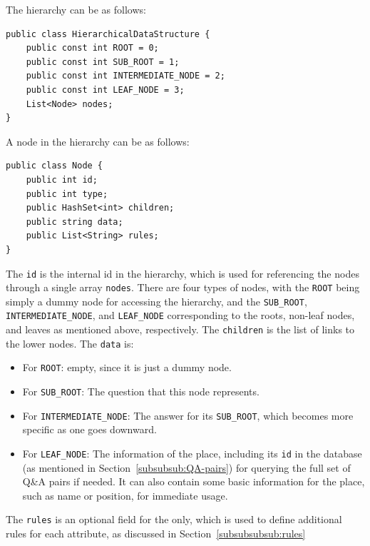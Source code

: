 The hierarchy can be as follows:
\begin{lstlisting}[style=cSharp]
public class HierarchicalDataStructure {
    public const int ROOT = 0;
    public const int SUB_ROOT = 1;
    public const int INTERMEDIATE_NODE = 2;
    public const int LEAF_NODE = 3;
    List<Node> nodes;
}
\end{lstlisting}

A node in the hierarchy can be as follows:

\begin{lstlisting}[style=cSharp]
public class Node {
    public int id;
    public int type;
    public HashSet<int> children;
    public string data;
    public List<String> rules;
}
\end{lstlisting}

The \texttt{id} is the internal id in the hierarchy, which is used for referencing the nodes through a single array \texttt{nodes}. There are four types of nodes, with the \texttt{ROOT} being simply a dummy node for accessing the hierarchy, and the \texttt{SUB\_ROOT}, \texttt{INTERMEDIATE\_NODE}, and \texttt{LEAF\_NODE} corresponding to the roots, non-leaf nodes, and leaves as mentioned above, respectively. The \texttt{children} is the list of links to the lower nodes. The \texttt{data} is:
\begin{itemize}
\item For \texttt{ROOT}: empty, since it is just a dummy node.
\item For \texttt{SUB\_ROOT}: The question that this node represents.
\item For \texttt{INTERMEDIATE\_NODE}: The answer for its \texttt{SUB\_ROOT}, which becomes more specific as one goes downward.
\item For \texttt{LEAF\_NODE}: The information of the place, including its \texttt{id} in the database (as mentioned in Section~\ref{subsubsub:QA-pairs}) for querying the full set of Q\&A pairs if needed. It can also contain some basic information for the place, such as name or position, for immediate usage.
\end{itemize}

The \texttt{rules} is an optional field for the  only, which is used to define additional rules for each attribute, as discussed in Section~\ref{subsubsubsub:rules}

